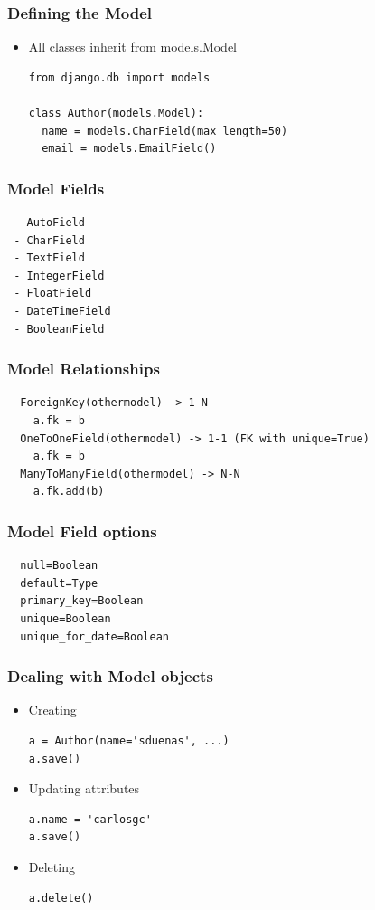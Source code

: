 \begin{frame}[fragile]
\frametitle{Defining the Model}
\begin{itemize}
\item All classes inherit from models.Model
{\scriptsize
\begin{verbatim}
from django.db import models
   
class Author(models.Model):
  name = models.CharField(max_length=50)
  email = models.EmailField()
\end{verbatim}
}
\end{itemize}
\end{frame}


\begin{frame}[fragile]
\frametitle{Model Fields}
{\scriptsize
\begin{verbatim}
 - AutoField
 - CharField
 - TextField
 - IntegerField
 - FloatField
 - DateTimeField
 - BooleanField
\end{verbatim}
}
\end{frame}


\begin{frame}[fragile]
\frametitle{Model Relationships}
{\scriptsize
\begin{verbatim}
  ForeignKey(othermodel) -> 1-N
    a.fk = b
  OneToOneField(othermodel) -> 1-1 (FK with unique=True)
    a.fk = b
  ManyToManyField(othermodel) -> N-N
    a.fk.add(b)
\end{verbatim}
}
\end{frame}


\begin{frame}[fragile]
\frametitle{Model Field options}
{\scriptsize
\begin{verbatim}
  null=Boolean
  default=Type
  primary_key=Boolean
  unique=Boolean
  unique_for_date=Boolean
\end{verbatim}
}
\end{frame}

\begin{frame}[fragile]
\frametitle{Dealing with Model objects}
\begin{itemize}
\item Creating
{\scriptsize
\begin{verbatim}
a = Author(name='sduenas', ...)
a.save()
\end{verbatim}
}
\item Updating attributes
{\scriptsize
\begin{verbatim}
a.name = 'carlosgc'
a.save()
\end{verbatim}
}
\item Deleting
{\scriptsize
\begin{verbatim}
a.delete()
\end{verbatim}
}
\end{itemize}
\end{frame}


